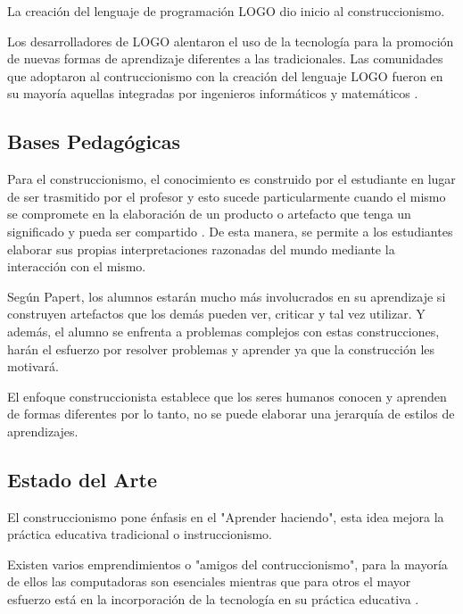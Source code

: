 La creación del lenguaje de programación LOGO dio inicio al construccionismo.

Los desarrolladores de LOGO alentaron el uso de la tecnología para la promoción de nuevas formas de aprendizaje diferentes a las tradicionales. Las comunidades que adoptaron al contruccionismo con la creación del lenguaje LOGO fueron en su mayoría aquellas integradas por ingenieros informáticos y matemáticos \cite{historia:2014}.



\subsection{Bases Pedagógicas}

Para el construccionismo, el conocimiento es construido por el estudiante en lugar de ser trasmitido por el profesor \cite{moses:2003} y esto sucede particularmente cuando el mismo se compromete en la elaboración de un producto o artefacto que tenga un significado y pueda ser compartido \cite{valdivia:sg}. De esta manera, se permite a los estudiantes elaborar sus propias interpretaciones razonadas del mundo mediante la interacción con el mismo. %

Según Papert, los alumnos estarán mucho más involucrados en su aprendizaje si construyen artefactos que los demás pueden ver, criticar y tal vez utilizar. Y además, el alumno se enfrenta a problemas complejos con estas construcciones, harán el esfuerzo por resolver problemas y aprender ya que la construcción les motivará\cite{const:vs}.

El enfoque construccionista establece que los seres humanos conocen y aprenden de formas diferentes por lo tanto, no se puede elaborar una jerarquía de estilos de aprendizajes\cite{valdivia:sg}.




\subsection{Estado del Arte}

El construccionismo pone énfasis en el "Aprender haciendo", esta idea mejora la práctica educativa tradicional o instruccionismo. 

Existen varios emprendimientos o "amigos del contruccionismo", para la mayoría de ellos las computadoras son esenciales mientras que para otros el mayor esfuerzo está en la incorporación de la tecnología en su práctica educativa \cite{papertian:const}.

